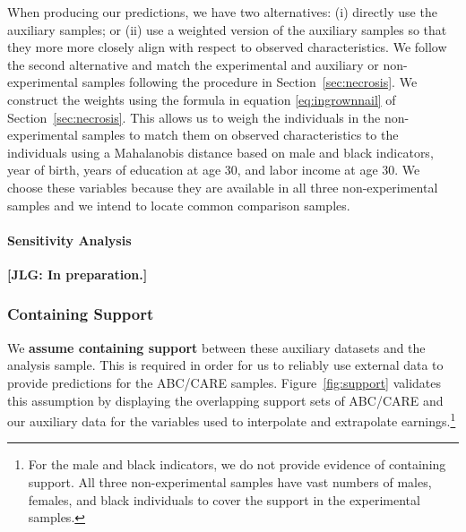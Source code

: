 \noindent When producing our predictions, we have two alternatives: (i) directly use the auxiliary samples; or (ii) use a weighted version of the auxiliary samples so that they more more closely align with respect to observed characteristics. We follow the second alternative and match the experimental and auxiliary or non-experimental samples following the procedure in Section~\ref{sec:necrosis}. We construct the weights using the formula in equation \eqref{eq:ingrownnail} of Section~\ref{sec:necrosis}. This allows us to weigh the individuals in the non-experimental samples to match them on observed characteristics to the individuals using a Mahalanobis distance based on male and black indicators, year of birth, years of education at age 30, and labor income at age 30. We choose these variables because they are available in all three non-experimental samples and we intend to locate common comparison samples. 

\paragraph{Sensitivity Analysis}

\noindent \textbf{[JLG: In preparation.]}

\subsubsection{Containing Support}

\noindent We \textbf{assume containing support} between these auxiliary datasets and the analysis sample. This is required in order for us to reliably use external data to provide predictions for the ABC/CARE samples. Figure~\ref{fig:support} validates this assumption by displaying the overlapping support sets of ABC/CARE and our auxiliary data for the variables used to interpolate and extrapolate earnings.\footnote{For the male and black indicators, we do not provide evidence of containing support. All three non-experimental samples have vast numbers of males, females, and black individuals to cover the support in the experimental samples.}\\


